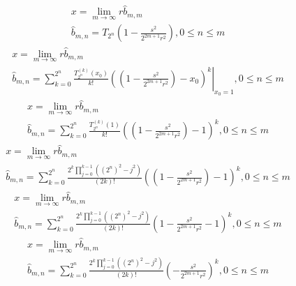 \documentclass[a4paper,12pt]{report}
\begin{document}
\begin{subequations}
\begin{gather}
x = \lim \limits_{m \to \infty} r \hat{b}_{m,m} \\
\hat{b}_{m,n} = T_{2^n}\left(1 - \frac{s^2}{2^{2m+1}r^2}\right), 0 \leq n \leq m
\end{gather}
\end{subequations}
\begin{subequations}
\begin{gather}
x = \lim \limits_{m \to \infty} r \hat{b}_{m,m} \\
\hat{b}_{m,n} = \left. \sum \limits_{k=0}^{2^n} \frac{T_{2^n}^{(k)}{(x_0)}}{k!} \left(\left(1 - \frac{s^2}{2^{2m+1}r^2}\right) - x_0\right)^k\right|_{x_0 = 1}, 0 \leq n \leq m
\end{gather}
\end{subequations}
\begin{subequations}
\begin{gather}
x = \lim \limits_{m \to \infty} r \hat{b}_{m,m} \\
\hat{b}_{m,n} = \sum \limits_{k=0}^{2^n} \frac{T_{2^n}^{(k)}{(1)}}{k!} \left(\left(1 - \frac{s^2}{2^{2m+1}r^2}\right) - 1\right)^k, 0 \leq n \leq m
\end{gather}
\end{subequations}
\begin{subequations}
\begin{gather}
x = \lim \limits_{m \to \infty} r \hat{b}_{m,m} \\
\hat{b}_{m,n} = \sum \limits_{k=0}^{2^n} \frac{2^{k} \prod \limits_{j=0}^{k-1} ((2^n)^2 - j^2)}{(2k)!} \left(\left(1 - \frac{s^2}{2^{2m+1}r^2}\right) - 1\right)^k, 0 \leq n \leq m
\end{gather}
\end{subequations}
\begin{subequations}
\begin{gather}
x = \lim \limits_{m \to \infty} r \hat{b}_{m,m} \\
\hat{b}_{m,n} = \sum \limits_{k=0}^{2^n} \frac{2^{k} \prod \limits_{j=0}^{k-1} ((2^n)^2 - j^2)}{(2k)!} \left(1 - \frac{s^2}{2^{2m+1}r^2} - 1\right)^k, 0 \leq n \leq m
\end{gather}
\end{subequations}
\begin{subequations}
\begin{gather}
x = \lim \limits_{m \to \infty} r \hat{b}_{m,m} \\
\hat{b}_{m,n} = \sum \limits_{k=0}^{2^n} \frac{2^{k} \prod \limits_{j=0}^{k-1} ((2^n)^2 - j^2)}{(2k)!} \left(-\frac{s^2}{2^{2m+1}r^2}\right)^k, 0 \leq n \leq m
\end{gather}
\end{subequations}
\end{document}
